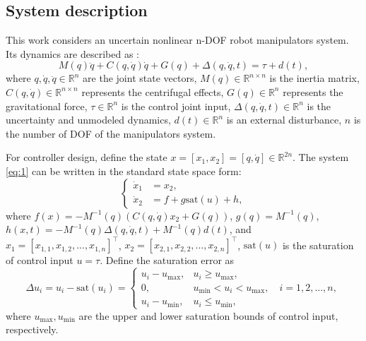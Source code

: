 \documentclass[pdflatex,sn-mathphys-num]{sn-jnl}%
\theoremstyle{thmstyleone}%
\theoremstyle{thmstyletwo}%
\theoremstyle{thmstylethree}%
\begin{document}
\subsection{System description}
\par This work considers an uncertain nonlinear n-DOF robot manipulators system. Its dynamics are described as \cite{SciaviccoSiciliano_2012_ModellingControl,BagheriEtAl_2019_Feedbacklinearization}:
\begin{equation}
	M(q)\ddot{q} + C(q, \dot{q})\dot{q} + G(q)+ \Delta(q, \dot{q}, t)= \tau + d(t),
	\label{eq:1}
\end{equation}
where $ q, \dot{q}, \ddot{q} \in \mathbb{R}^n $ are the joint state vectors, $M(q) \in \mathbb{R}^{n\times n}$ is the inertia matrix, $C(q, \dot{q}) \in \mathbb{R}^{n\times n} $ represents the centrifugal effects, $G(q) \in \mathbb{R}^n $ represents the gravitational force, $\tau \in \mathbb{R}^n$ is the control joint input, $\Delta(q, \dot{q}, t) \in \mathbb{R}^n$ is the uncertainty and unmodeled dynamics, $d(t) \in \mathbb{R}^n$ is an external disturbance, $n$ is the number of DOF of the manipulators system.

For controller design, define the state $x = [x_1,x_2] = [q,\dot{q}] \in \mathbb{R}^{2n}$. The system \cref{eq:1} can be written in the standard state space form:
\begin{equation}
	\left\{
	\begin{aligned}
		\dot{x}_1 & = x_2,     \\
		\dot{x}_2 & =f +g \mathrm{sat}(u) +h,
	\end{aligned}
	\right.
	\label{eq:2}
\end{equation}
where $f(x)=-M^{-1}(q) (C(q,\dot{q})x_2 + G(q)) $, $g(q)=M^{-1}(q)$, $h(x,t)=-M^{-1}(q)\Delta(q,\dot{q},t) +M^{-1}(q) d(t)$, and $x_1=[x_{1,1},x_{1,2},...,x_{1,n}]^{\top}$, $x_2=[x_{2,1},x_{2,2},...,x_{2,n}]^{\top}$, $\mathrm{sat}(u)$ is the saturation of control input $u=\tau$. Define the saturation error as
\begin{equation}\label{eq:3}
\Delta u_{i} =  u_{i}-\mathrm{sat}(u_i)=\begin{cases} 
	u_{i}-u_{\max}, & u_i \geq u_{\max}, \\
0,       & u_{\min} < u_i < u_{\max},  \quad i=1,2,...,n,\\
u_{i}-u_{\min}, & u_i \leq u_{\min},
\end{cases}
\end{equation}
where $u_{\max},u_{\min}$ are the upper and lower saturation bounds of control input, respectively.
\end{document}
